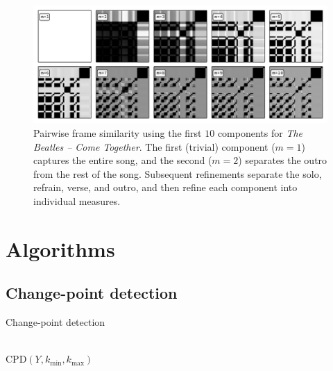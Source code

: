 \documentclass{article}
\begin{document}
 
\begin{figure}
\centering
\includegraphics[width=\textwidth]{figs/lowrank}
\caption{Pairwise frame similarity using the first $10$ components for \emph{The Beatles -- Come Together}.  The first
(trivial) component ($m=1$) captures the entire song, and the second ($m=2$) separates
the outro from the rest of the song.  Subsequent refinements separate the solo,
refrain, verse, and outro, and then refine each component into individual measures.\label{lowrank}}
\end{figure}

\section{Algorithms}

\subsection{Change-point detection}

\begin{algorithm}
\caption{Change-point detection\label{cpd}}
\begin{algorithmic}[1]
\\
{\sc CPD}$(Y, k_\text{min}, k_\text{max})$
        \\
        \ENDIF
    \ENDFOR
\end{algorithmic}
\end{algorithm}
\end{document}
